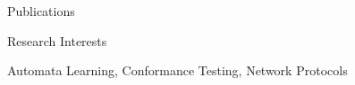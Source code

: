 \documentclass{resume} %
\begin{document}


\begin{rSection}{Publications}

\item {}
\smallskip{}
\item {}
\smallskip{}
\item {}
\smallskip{}
\item {}
\smallskip{}
\item {}
\smallskip{}
\item {}
%
%
\end{rSection}

\begin{rSection}{Research Interests}
\item Automata Learning, Conformance Testing, Network Protocols  
\end{rSection}

\end{document}
